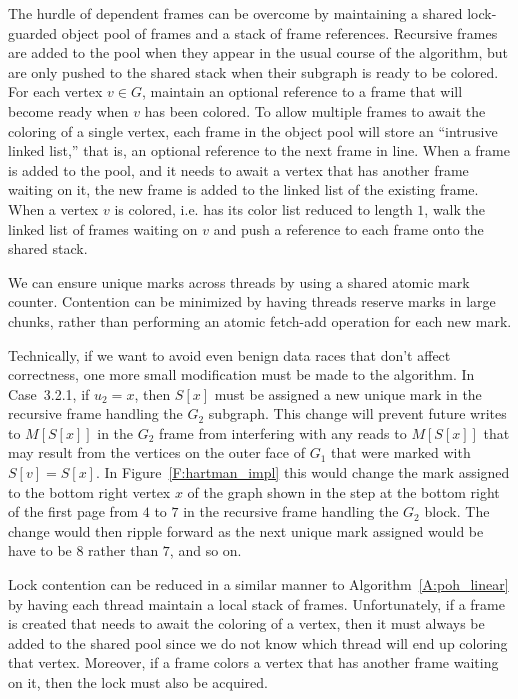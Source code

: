 \documentclass[12pt,letterpaper]{article}
\theoremstyle{plain}
\theoremstyle{definition}
\theoremstyle{break}
\begin{document}
The hurdle of dependent frames can be overcome by maintaining a shared
lock-guarded object pool
of frames and a stack of frame references. Recursive frames are added to the
pool when they appear in the usual course of the algorithm, but
are only pushed to the shared stack when their subgraph is ready to
be colored. For each vertex $v\in G$, maintain an optional reference
to a frame that will become ready when $v$ has been colored. To allow
multiple frames to await the coloring of a single vertex, each frame in the
object pool will store an ``intrusive linked list,'' that is, an optional
reference to the next frame in line. When a frame is added to the pool, and
it needs to await a vertex that has another frame waiting on it,
the new frame is added to the linked list of the existing frame.
When a vertex $v$ is colored, i.e. has its color list reduced to length $1$,
walk the linked list of frames waiting on $v$
and push a reference to each frame onto the shared stack.

We can ensure unique marks across threads by using a shared atomic mark
counter.
Contention can be minimized by having
threads reserve marks in large chunks, rather than performing an
atomic fetch-add operation for each new mark.

Technically, if we want to avoid even benign data races that don't affect
correctness, one more small
modification must be made to the algorithm.
In Case~3.2.1, if $u_2= x$, then $S[x]$ must be assigned a new unique mark
in the recursive frame handling the $G_2$ subgraph. This change will
prevent future writes to $M[S[x]]$ in the $G_2$ frame from
interfering with any reads to $M[S[x]]$ that may result from the vertices on the
outer face of $G_1$ that were marked with $S[v]=S[x]$. In
Figure~\ref{F:hartman_impl} this would change the mark assigned to the bottom
right vertex $x$ of the graph shown in the step at the bottom right of
the first page from $4$ to $7$ in the recursive frame handling the $G_2$ block.
The change would then ripple forward as the next unique mark
assigned would be have to be $8$ rather than $7$, and so on.

Lock contention can be reduced in a similar manner to
Algorithm~\ref{A:poh_linear} by having each thread maintain a local stack of
frames. Unfortunately, if a frame is created that needs to await the coloring
of a vertex, then it must always be added to the shared pool since we do not
know which thread will end up coloring that vertex.
Moreover, if a frame colors a
vertex that has another frame waiting on it, then the lock must also be
acquired.
\end{document}
